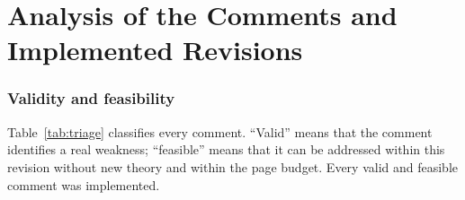 \documentclass[10pt,a4paper]{article}
\begin{document}
\part{Analysis of the Comments and Implemented Revisions}\label{part:analysis}

\section{Validity and feasibility}
Table~\ref{tab:triage} classifies every comment. ``Valid'' means that the comment identifies a real weakness; ``feasible'' means that it can be addressed within this revision without new theory and within the page budget. Every valid and feasible comment was implemented.
\end{document}

